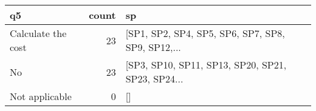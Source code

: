 \begin{tabular}{lrl}
\toprule
                 q5 &  count &                                                 sp \\
\midrule
 Calculate the cost &     23 &  [SP1, SP2, SP4, SP5, SP6, SP7, SP8, SP9, SP12,... \\
                 No &     23 &  [SP3, SP10, SP11, SP13, SP20, SP21, SP23, SP24... \\
     Not applicable &      0 &                                                 [] \\
\bottomrule
\end{tabular}
